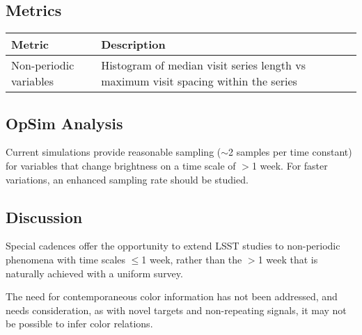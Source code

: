 
\subsection{Metrics}
\label{sec:\secname:metrics}

\begin{center}
\begin{tabular}{| p{5cm} |p{10cm} |}
\hline Metric & Description\\
\hline
Non-periodic variables & Histogram of median visit series length vs maximum visit spacing within the series\\
  \hline \end{tabular}
 \end{center}



\subsection{OpSim Analysis}
\label{sec:\secname:analysis}

Current simulations provide reasonable sampling ($\sim$2 samples per time constant) for variables that change brightness on a time scale of $>$1 week.  For faster variations, an enhanced sampling rate should be studied.



\subsection{Discussion}
\label{sec:\secname:discussion}

Special cadences offer the opportunity to extend LSST studies to non-periodic phenomena with time scales $\leq$1 week, rather than the $>$1 week that is naturally achieved with a uniform survey.


The need for contemporaneous color information has not been addressed, and needs consideration, as with novel targets and non-repeating signals, it may not be possible to infer color relations.

\navigationbar
